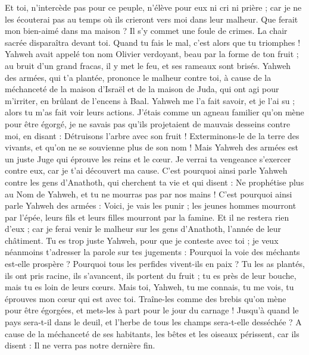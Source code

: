 \begin{multicols}{2}
Et toi, n'intercède pas pour ce peuple, n'élève pour eux ni cri ni prière ; car je ne les écouterai pas au temps où ils crieront vers moi dans leur malheur.
Que ferait mon bien-aimé dans ma maison ? Il s'y commet une foule de crimes. La chair sacrée disparaîtra devant toi. Quand tu fais le mal, c'est alors que tu triomphes !
Yahweh avait appelé ton nom Olivier verdoyant, beau par la forme de ton fruit ; au bruit d'un grand fracas, il y met le feu, et ses rameaux sont brisés.
Yahweh des armées, qui t'a plantée, prononce le malheur contre toi, à cause de la méchanceté de la maison d'Israël et de la maison de Juda, qui ont agi pour m'irriter, en brûlant de l'encens à Baal.
Yahweh me l'a fait savoir, et je l'ai su ; alors tu m'as fait voir leurs actions.
J'étais comme un agneau familier qu'on mène pour être égorgé, je ne savais pas qu'ils projetaient de mauvais desseins contre moi, en disant : Détruisons l'arbre avec son fruit ! Exterminons-le de la terre des vivants, et qu'on ne se souvienne plus de son nom !
Mais Yahweh des armées est un juste Juge qui éprouve les reins et le cœur. Je verrai ta vengeance s'exercer contre eux, car je t'ai découvert ma cause.
C'est pourquoi ainsi parle Yahweh contre les gens d'Anathoth, qui cherchent ta vie et qui disent : Ne prophétise plus au Nom de Yahweh, et tu ne mourras pas par nos mains !
C'est pourquoi ainsi parle Yahweh des armées : Voici, je vais les punir ; les jeunes hommes mourront par l'épée, leurs fils et leurs filles mourront par la famine.
Et il ne restera rien d'eux ; car je ferai venir le malheur sur les gens d'Anathoth, l'année de leur châtiment.
\VerseOne{}Tu es trop juste Yahweh, pour que je conteste avec toi ; je veux néanmoins t'adresser la parole sur tes jugements : Pourquoi la voie des méchants est-elle prospère ? Pourquoi tous les perfides vivent-ils en paix ?
Tu les as plantés, ils ont pris racine, ils s'avancent, ils portent du fruit ; tu es près de leur bouche, mais tu es loin de leurs cœurs.
Mais toi, Yahweh, tu me connais, tu me vois, tu éprouves mon cœur qui est avec toi. Traîne-les comme des brebis qu'on mène pour être égorgées, et mets-les à part pour le jour du carnage !
Jusqu'à quand le pays sera-t-il dans le deuil, et l'herbe de tous les champs sera-t-elle desséchée ? A cause de la méchanceté de ses habitants, les bêtes et les oiseaux périssent, car ils disent : Il ne verra pas notre dernière fin.

\end{multicols}

